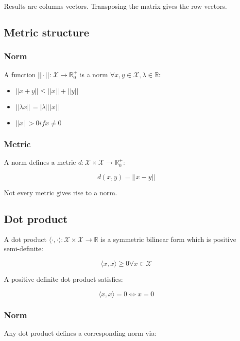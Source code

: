 	Results are columns vectors.
	Transposing the matrix gives the row vectors.

	\subsection{Metric structure}

		\subsubsection{Norm}
		A function $||\cdot ||: \mathcal{X} \rightarrow \mathbb{R}^+_0$ is a norm $\forall x,y\in\mathcal{X},\lambda\in\mathbb{R}$:

		\begin{multicols}{3}
			\begin{itemize}
				\item $||x + y|| \le ||x|| + ||y||$
				\item $||\lambda x || = |\lambda| ||x||$
				\item $||x||>0 if x\neq 0$
			\end{itemize}
		\end{multicols}

		\subsubsection{Metric}
		A norm defines a metric $d: \mathcal{X}\times\mathcal{X}\rightarrow\mathbb{R}_0^+$:

		$$d(x,y) = ||x - y||$$

		Not every metric gives rise to a norm.

	\subsection{Dot product}
	A dot product $\langle \cdot, \cdot\rangle:\mathcal{X}\times\mathcal{X}\rightarrow\mathbb{R}$ is a symmetric bilinear form which is positive semi-definite:

	$$\langle x, x\rangle \ge 0\forall x \in\mathcal{X}$$

	A positive definite dot product satisfies:

	$$\langle x, x\rangle = 0 \Leftrightarrow x = 0$$

		\subsubsection{Norm}
		Any dot product defines a corresponding norm via:

